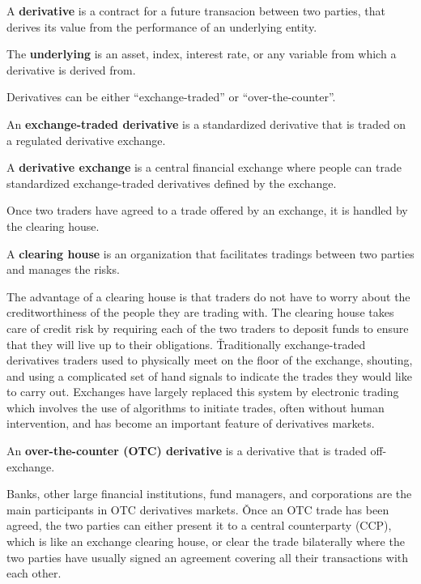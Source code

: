 \bd[Derivative]
A \textbf{derivative} is a contract for a future transacion between two parties, that derives its value from the
performance of an underlying entity.
\ed

\bd[Underlying]
The \textbf{underlying} is an asset, index, interest rate, or any variable from which a derivative is derived from.
\ed

Derivatives can be either ``exchange-traded'' or ``over-the-counter''.

An \textbf{exchange-traded derivative} is a standardized derivative that is traded on a regulated derivative exchange.
\ed

A \textbf{derivative exchange} is a central financial exchange where people can trade standardized exchange-traded
derivatives defined by the exchange.
\ed

Once two traders have agreed to a trade offered by an exchange, it is handled by the clearing house.

A \textbf{clearing house} is an organization that facilitates tradings between two parties and manages the risks.
\ed

The advantage of a clearing house is that traders do not have to worry about the creditworthiness of the people they
are trading with. The clearing house takes care of credit risk by requiring each of the two traders to deposit funds
to ensure that they will live up to their obligations. \v

Traditionally exchange-traded derivatives traders used to physically meet on the floor of the exchange, shouting, and
using a complicated set of hand signals to indicate the trades they would like to carry out. Exchanges have largely
replaced this system by electronic trading which involves the use of algorithms to initiate trades, often without human
intervention, and has become an important feature of derivatives markets.

An \textbf{over-the-counter (OTC) derivative} is a derivative that is traded off-exchange.
\ed

Banks, other large financial institutions, fund managers, and corporations are the main participants in OTC derivatives
markets. \v

Once an OTC trade has been agreed, the two parties can either present it to a central counterparty (CCP), which is like
an exchange clearing house, or clear the trade bilaterally where the two parties have usually signed an agreement
covering all their transactions with each other.

